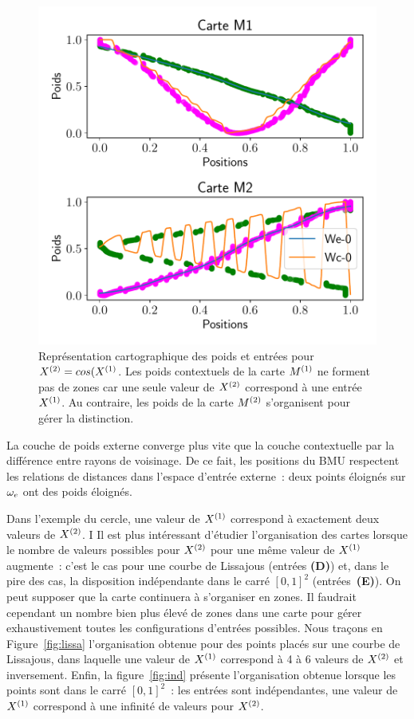 \documentclass[../main]{subfiles}
\begin{document}
	\begin{figure}
		\centering\includegraphics[width=\textwidth]{2som_cos_w.pdf}
		\caption{Représentation cartographique des poids et entrées pour $X^{({2})} = cos(X^{({1})}$. Les poids contextuels de la carte $M^{({1})}$ ne forment pas de zones car une seule valeur de $X^{({2})}$ correspond à une entrée $X^{({1})}$. Au contraire, les poids de la carte $M^{({2})}$ s'organisent pour gérer la distinction. \label{fig:cos_results}}
	\end{figure}

La couche de poids externe converge plus vite que la couche contextuelle par la différence entre rayons de voisinage. De ce fait, les positions du BMU respectent les relations de distances dans l'espace d'entrée externe~: deux points éloignés sur $\omega_e$ ont des poids éloignés.

Dans l'exemple du cercle, une valeur de $X^{({1})}$ correspond à exactement deux valeurs de $X^{({2})}$. I
Il est plus intéressant d'étudier l'organisation des cartes lorsque le nombre de valeurs possibles pour $X^{({2})}$ pour une même valeur de $X^{({1})}$ augmente~: c'est le cas pour une courbe de Lissajous (entrées \textbf{(D)}) et, dans le pire des cas, la disposition indépendante dans le carré $[0,1]^2$ (entrées~\textbf{(E)}).
On peut supposer que la carte continuera à s'organiser en zones. 
Il faudrait cependant un nombre bien plus élevé de zones dans une carte pour gérer exhaustivement toutes les configurations d'entrées possibles.
Nous traçons en Figure~\ref{fig:lissa} l'organisation obtenue pour des points placés sur une courbe de Lissajous, dans laquelle une valeur de $X^{({1})}$ correspond à 4 à 6 valeurs de $X^{({2})}$ et inversement. 
Enfin, la figure~\ref{fig:ind} présente l'organisation obtenue lorsque les points sont dans le carré $[0,1]^2$~: les entrées sont indépendantes, une valeur de $X^{({1})}$ correspond à une infinité de valeurs pour $X^{({2})}$. 
\end{document}
